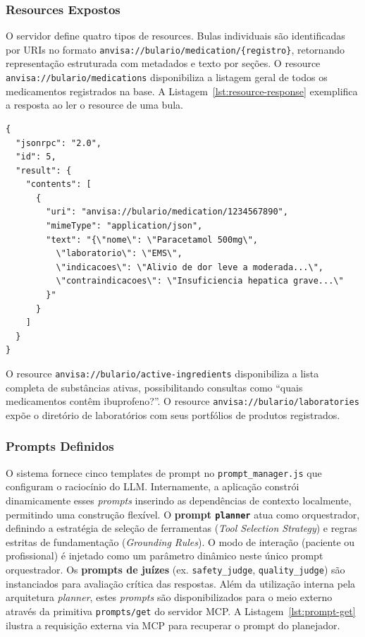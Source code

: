 \documentclass[12pt]{article}
\begin{document}
\FloatBarrier

\subsubsection{Resources Expostos}

O servidor define quatro tipos de resources. Bulas individuais são identificadas por URIs no formato \texttt{anvisa://bulario/medication/\{registro\}}, retornando representação estruturada com metadados e texto por seções. O resource \texttt{anvisa://bulario/medications} disponibiliza a listagem geral de todos os medicamentos registrados na base. A Listagem~\ref{lst:resource-response} exemplifica a resposta ao ler o resource de uma bula.

\begin{lstlisting}[caption={Resposta JSON-RPC ao ler o resource de uma bula ANVISA}, label={lst:resource-response}]
{
  "jsonrpc": "2.0",
  "id": 5,
  "result": {
    "contents": [
      {
        "uri": "anvisa://bulario/medication/1234567890",
        "mimeType": "application/json",
        "text": "{\"nome\": \"Paracetamol 500mg\",
          \"laboratorio\": \"EMS\",
          \"indicacoes\": \"Alivio de dor leve a moderada...\",
          \"contraindicacoes\": \"Insuficiencia hepatica grave...\"
        }"
      }
    ]
  }
}
\end{lstlisting}

O resource \texttt{anvisa://bulario/active-ingredients} disponibiliza a lista completa de substâncias ativas, possibilitando consultas como ``quais medicamentos contêm ibuprofeno?''. O resource \texttt{anvisa://bulario/laboratories} expõe o diretório de laboratórios com seus portfólios de produtos registrados.

\subsubsection{Prompts Definidos}

O sistema fornece cinco templates de prompt no \texttt{prompt\_manager.js} que configuram o raciocínio do LLM. Internamente, a aplicação constrói dinamicamente esses \textit{prompts} inserindo as dependências de contexto localmente, permitindo uma construção flexível. O \textbf{prompt \texttt{planner}} atua como orquestrador, definindo a estratégia de seleção de ferramentas ({\textit{Tool Selection Strategy}}) e regras estritas de fundamentação ({\textit{Grounding Rules}}). O modo de interação (paciente ou profissional) é injetado como um parâmetro dinâmico neste único prompt orquestrador. Os \textbf{prompts de juízes} (ex. \texttt{safety\_judge}, \texttt{quality\_judge}) são instanciados para avaliação crítica das respostas. Além da utilização interna pela arquitetura \textit{planner}, estes \textit{prompts} são disponibilizados para o meio externo através da primitiva \texttt{prompts/get} do servidor MCP. A Listagem~\ref{lst:prompt-get} ilustra a requisição externa via MCP para recuperar o prompt do planejador.
\end{document}
